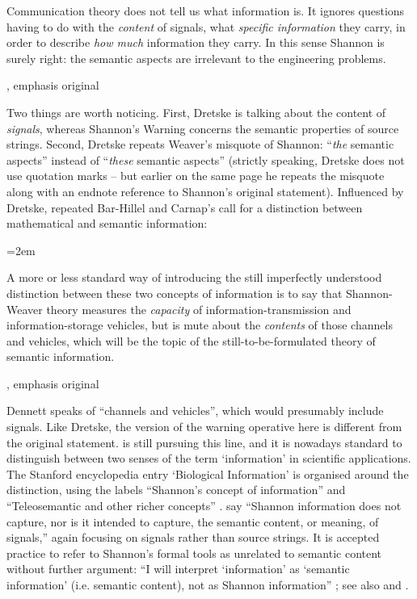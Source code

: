 \documentclass[12pt]{article}
\begin{document}
\begin{myquote}
Communication theory does not tell us what information is.
It ignores questions having to do with the \emph{content} of signals, what \emph{specific information} they carry, in order to describe \emph{how much} information they carry.
In this sense Shannon is surely right: the semantic aspects are irrelevant to the engineering problems.
\par\hspace*{\fill}\citet[41]{dretske1981knowledge}, emphasis original
\end{myquote}

\noindent Two things are worth noticing.
First, Dretske is talking about the content of \textit{signals}, whereas {\sc Shannon's Warning} concerns the semantic properties of source strings.
Second, Dretske repeats Weaver's misquote of Shannon: ``\textit{the} semantic aspects'' instead of ``\textit{these} semantic aspects'' (strictly speaking, Dretske does not use quotation marks -- but earlier on the same page he repeats the misquote along with an endnote reference to Shannon's original statement).
Influenced by Dretske, \citet{dennett1983intentional} repeated Bar-Hillel and Carnap's call for a distinction between mathematical and semantic information:

{ \emergencystretch=2em

\begin{myquote}
A more or less standard way of introducing the still imperfectly understood distinction between these two concepts of information is to say that Shannon-Weaver theory measures the \emph{capacity} of information-transmission and information-storage vehicles, but is mute about the \emph{contents} of those channels and vehicles, which will be the topic of the still-to-be-formulated theory of semantic information.
\par\hspace*{\fill}\citet[344]{dennett1983intentional}, emphasis original
\end{myquote}

}

\noindent Dennett speaks of ``channels and vehicles'', which would presumably include signals.
Like Dretske, the version of the warning operative here is different from the original statement.
\citet[$\S$6]{dennett2017bacteria} is still pursuing this line, and it is nowadays standard to distinguish between two senses of the term `information' in scientific applications.
The Stanford encyclopedia entry `Biological Information' is organised around the distinction, using the labels ``Shannon's concept of information'' and ``Teleosemantic and other richer concepts'' \citep{godfrey-smith2016biological}.
\citet[21]{piccinini2011information} say ``Shannon information does not capture, nor is it intended to capture, the semantic content, or meaning, of signals,'' again focusing on signals rather than source strings.
It is accepted practice to refer to Shannon's formal tools as unrelated to semantic content without further argument: ``I will interpret ‘information’ as ‘semantic information’ (i.e. semantic content), not as Shannon information'' \citep[p. 12 n. 14]{artiga2020signals}; see also \citet[6]{cao2020new} and \citet[1]{kolchinsky2018semantic}.
\end{document}
